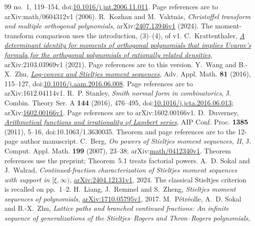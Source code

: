\documentclass[11pt]{article}
\begin{document}
\begin{thebibliography}{99}
  no.~1, 119--154,
  doi:\href{https://doi.org/10.1016/j.jnt.2006.11.011}{10.1016/j.jnt.2006.11.011}.
  Page references are to arXiv:math/0604312v1 (2006).
 R.~Kozhan and M.~Vaktn\"{a}s,
  \emph{Christoffel transform and multiple orthogonal polynomials},
  arXiv:\href{https://arxiv.org/abs/2407.13946v1}{2407.13946v1} (2024).
  The moment-transform comparison uses the introduction, (3)--(4), of v1.
 C.~Krattenthaler,
  \href{https://arxiv.org/abs/2103.03969v1}{\emph{A determinant identity for
  moments of orthogonal polynomials that implies Uvarov's formula for the
  orthogonal polynomials of rationally related densities}},
  arXiv:2103.03969v1 (2021). Page references are to this version.
 Y.~Wang and B.-X.~Zhu,
  \href{https://arxiv.org/abs/1612.04114v1}{\emph{Log-convex and Stieltjes
  moment sequences}}, Adv. Appl. Math. \textbf{81} (2016), 115--127,
  doi:\href{https://doi.org/10.1016/j.aam.2016.06.008}{10.1016/j.aam.2016.06.008}.
  Page references are to arXiv:1612.04114v1.
 R.~P. Stanley, \emph{Smith normal form in combinatorics},
  J. Combin. Theory Ser. A \textbf{144} (2016), 476--495,
  doi:\href{https://doi.org/10.1016/j.jcta.2016.06.013}{10.1016/j.jcta.2016.06.013};
  arXiv:\href{https://arxiv.org/abs/1602.00166v1}{1602.00166v1}.
  Page references are to arXiv:1602.00166v1.
 D.~Duverney,
  \href{https://doi.org/10.1063/1.3630035}{\emph{Arithmetical functions and
  irrationality of Lambert series}}, AIP Conf. Proc. \textbf{1385} (2011),
  5--16, doi:10.1063/1.3630035. Theorem and page references are to the
  12-page author manuscript.
 C.~Berg, \emph{On powers of Stieltjes moment sequences, II},
  J. Comput. Appl. Math. \textbf{199} (2007), 23--38;
  arXiv:\href{https://arxiv.org/abs/math/0412340v1}{math/0412340v1}.
  Theorem references use the preprint; Theorem~5.1 treats factorial powers.
 A.~D. Sokal and J.~Walrad,
  \emph{Continued-fraction characterization of Stieltjes moment sequences
  with support in $[\xi,\infty)$},
  \href{https://arxiv.org/abs/2404.12131v1}{arXiv:2404.12131v1}, 2024.
  The classical Stieltjes criterion is recalled on pp.~1--2.
 H.~Liang, J.~Remmel and S.~Zheng,
  \emph{Stieltjes moment sequences of polynomials},
  \href{https://arxiv.org/abs/1710.05795v1}{arXiv:1710.05795v1}, 2017.
 M.~P\'etr\'eolle, A.~D. Sokal and B.-X.~Zhu,
  \emph{Lattice paths and branched continued fractions: An infinite sequence
  of generalizations of the Stieltjes--Rogers and Thron--Rogers polynomials,
}
\end{thebibliography}
\end{document}
